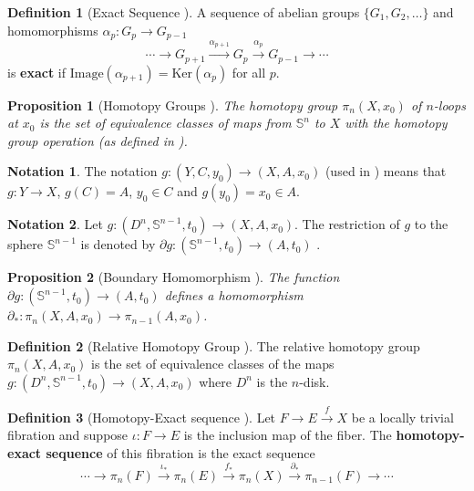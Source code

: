 \documentclass[12pt]{article}
\newtheorem{prop}{Proposition}
\theoremstyle{definition}
\newtheorem{defn}{Definition}
\newtheorem*{notation}{Notation}
\begin{document}
\begin{defn}[Exact Sequence \cite{intro-top-manifolds}]
    A sequence of abelian groups \(\{G_1, G_2, \ldots\}\) and
    homomorphisms \(\alpha_p : G_p \rightarrow G_{p-1}\)
    \[
        \cdots \rightarrow G_{p+1} \xrightarrow{\alpha_{p+1}} G_p
    \xrightarrow{\alpha_p} G_{p-1} \rightarrow \cdots
    \]
    is \textbf{exact} if \(\text{Image}(\alpha_{p+1}) = \text{Ker}(\alpha_p)\)
    for all \(p\).
\end{defn}

\begin{prop}[Homotopy Groups \cite{topology-fiber-bundles}]
    The homotopy group \(\pi_n(X,x_0)\) of \(n\)-loops at \(x_0\) is the
    set of equivalence classes of maps from \(\mathbb{S}^n\) to \(X\) with the
    homotopy group operation (as defined in \cite{intro-top-manifolds}).
\end{prop}

\begin{notation}
    The notation \(g : (Y,C,y_0) \rightarrow (X,A,x_0)\) (used in 
    \cite{topology-fiber-bundles}) means that \(g : Y \rightarrow X\), 
    \(g(C) = A\), \(y_0 \in C\) and \(g(y_0) = x_0 \in A\).
\end{notation}

\begin{notation}
    Let \(g : (D^n, \mathbb{S}^{n-1},t_0) \rightarrow (X,A,x_0)\). 
    The restriction of \(g\) to the sphere \(\mathbb{S}^{n-1}\) is denoted by 
    \(\partial g : (\mathbb{S}^{n-1},t_0) \rightarrow (A,t_0)\)
    \cite{topology-fiber-bundles}.
\end{notation}

\begin{prop}[Boundary Homomorphism \cite{topology-fiber-bundles}]
    The function \(\partial g : (\mathbb{S}^{n-1},t_0) \rightarrow (A,t_0)\)
    defines a homomorphism 
    \(\partial_* : \pi_n(X,A,x_0) \rightarrow \pi_{n-1}(A,x_0)\).
\end{prop}

\begin{defn}[Relative Homotopy Group \cite{topology-fiber-bundles}]
    The relative homotopy group \(\pi_n(X,A,x_0)\) is the set of equivalence classes
    of the maps \(g : (D^n,\mathbb{S}^{n-1},t_0) \rightarrow (X, A, x_0)\)
    where \(D^n\) is the \(n\)-disk.
\end{defn}

\begin{defn}[Homotopy-Exact sequence \cite{topology-fiber-bundles}]
    Let \(F \rightarrow E \xrightarrow{f} X\) be a locally trivial fibration and suppose
    \(\iota : F \rightarrow E\) is the inclusion map of the fiber.
    The \textbf{homotopy-exact sequence} of this fibration is the exact sequence
    \[
        \cdots \rightarrow \pi_n(F) \xrightarrow{\iota_*} \pi_n(E) 
        \xrightarrow{f_*} \pi_n(X) \xrightarrow{\partial_*} \pi_{n-1}(F)
        \rightarrow \cdots
    \]
\end{defn}
\end{document}
